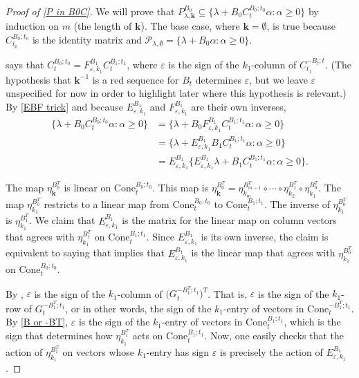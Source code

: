 \documentclass{amsart}
\theoremstyle{definition}
\theoremstyle{remark}
\numberwithin{equation}{section}
\newcommand{\ep}{\varepsilon}
\newcommand{\set}[1]{{\lbrace #1 \rbrace}}
\renewcommand{\th}{^\text{th}}
\newcommand{\0}{{\mathbf{0}}}
\newcommand{\Cone}{\mathrm{Cone}}
\newcommand{\kk}{\mathbf{k}}
\renewcommand{\P}{\mathcal{P}}
\renewcommand{\th}{^\text{th}}
\begin{document}
\begin{proof}[Proof of \cref{P in B0C}]
We will prove that $P^{B_0}_{\lambda,\kk}\subseteq\set{\lambda+B_0C_t^{B_0;t_0}\alpha:\alpha\ge0}$ by induction on $m$ (the length of $\kk$).
The base case, where $\kk=\emptyset$, is true because $C_{t_0}^{B_0;t_0}$ is the identity matrix and $\P_{\lambda,\emptyset}=\set{\lambda+B_0\alpha:\alpha\ge0}$.
 
\cite[Proposition~1.4]{NZ12} says that $C_t^{B_0;t_0}=F^{B_1}_{\ep,k_1}C_t^{B_1;t_1}$, where $\ep$ is the sign of the $k_1$-column of $C_{t_1}^{-B_t;t}$.  
(The hypothesis that $\kk^{-1}$ is a red sequence for $B_t$ determines $\ep$, but we leave $\ep$ unspecified for now in order to highlight later where this hypothesis is relevant.)
By \cref{EBF trick} and because $E^{B_1}_{\ep,k_1}$ and $F^{B_1}_{\ep,k_1}$ are their own inverses,
\begin{equation}\label{ind B0C}\begin{aligned}
\set{\lambda+B_0C_t^{B_0;t_0}\alpha:\alpha\ge0}
&=\set{\lambda+B_0F^{B_1}_{\ep,k_1}C_t^{B_1;t_1}\alpha:\alpha\ge0}\\
&=\set{\lambda+E^{B_1}_{\ep,k_1}B_1C_t^{B_1;t_1}\alpha:\alpha\ge0}\\
&=E^{B_1}_{\ep,k_1}\set{E^{B_1}_{\ep,k_1}\lambda+B_1C_t^{B_1;t_1}\alpha:\alpha\ge0}.
\end{aligned}\end{equation}

The map $\eta_{\kk}^{B_0^T}$ is linear on $\Cone_t^{B_0;t_0}$.  
This map is $\eta_{\kk}^{B_0^T}={\eta_{k_m}^{B_{m-1}^T}\circ\cdots\circ\eta_{k_2}^{B_1^T}\circ\eta_{k_1}^{B_0^T}}$.
The map $\eta_{k_1}^{B_0^T}$ restricts to a linear map from $\Cone_t^{B_0;t_0}$ to $\Cone_t^{B_1;t_1}$.
The inverse of $\eta_{k_1}^{B_0^T}$ is $\eta_{k_1}^{B_1^T}$.
We claim that $E^{B_1}_{\ep,k_1}$ is the matrix for the linear map on column vectors that agrees with $\eta_{k_1}^{B_1^T}$ on $\Cone_t^{B_1;t_1}$.
Since $E^{B_1}_{\ep,k_1}$ is its own inverse, the claim is equivalent to saying that implies that $E^{B_1}_{\ep,k_1}$ is the linear map that agrees with $\eta_{k_1}^{B_0^T}$ on $\Cone_t^{B_0;t_0}$.

By \cite[(1.13)]{NZ12}, $\ep$ is the sign of the $k_1$-column of $\bigl(G_t^{-B_1^T;t_1}\bigr)^T$.
That is, $\ep$ is the sign of the $k_1$-row of $G_t^{-B_1^T;t_1}$, or in other words, the sign of the $k_1$-entry of vectors in $\Cone_t^{-B^T_1;t_1}$.
By \cref{B or -BT}, $\ep$ is the sign of the $k_1$-entry of vectors in $\Cone_t^{B_1;t_1}$, which is the sign that determines how $\eta_{k_1}^{B_1^T}$ acts on $\Cone_t^{B_1;t_1}$.
Now, one easily checks that the action of $\eta_{k_1}^{B_1^T}$ on vectors whose $k_1$-entry has sign $\ep$ is precisely the action of $E^{B_1}_{\ep,k_1}$.


\end{proof}
\end{document}
